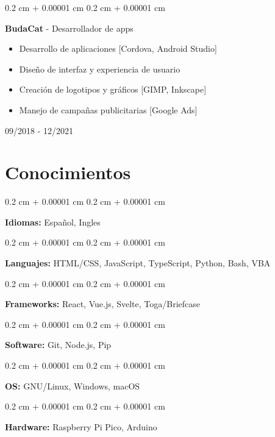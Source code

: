 \documentclass[12pt, letterpaper]{article}
\newenvironment{highlights}{
    \begin{itemize}[
        topsep=0.10 cm,
        parsep=0.10 cm,
        partopsep=0pt,
        itemsep=0pt,
        leftmargin=0.4 cm + 10pt
    ]
}{
    \end{itemize}
} %
\newenvironment{onecolentry}{
    \begin{adjustwidth}{
        0.2 cm + 0.00001 cm
    }{
        0.2 cm + 0.00001 cm
    }
}{
    \end{adjustwidth}
} %
\newenvironment{twocolentry}[2][]{
    \onecolentry
    \def\secondColumn{#2}
    \setcolumnwidth{\fill, 4.5 cm}
    \begin{paracol}{2}
}{
    \switchcolumn \raggedleft \secondColumn
    \end{paracol}
    \endonecolentry
} %
\begin{document}
\vspace{0.3 cm}

\begin{twocolentry}{

        09/2018 - 12/2021
    }
    \textbf{BudaCat} - Desarrollador de apps
    \begin{highlights}
        \item Desarrollo de aplicaciones [Cordova, Android Studio]
        \item Diseño de interfaz y experiencia de usuario
        \item Creación de logotipos y gráficos [GIMP, Inkscape]
        \item Manejo de campañas publicitarias [Google Ads]
    \end{highlights}
\end{twocolentry}

\vspace{0.5 cm}

\section{Conocimientos}

\vspace{0.2 cm}

\begin{onecolentry}
    \textbf{Idiomas:} Español, Ingles
\end{onecolentry}

\vspace{0.2 cm}

\begin{onecolentry}
    \textbf{Languajes:} HTML/CSS, JavaScript, TypeScript, Python, Bash, VBA
\end{onecolentry}

\vspace{0.2 cm}

\begin{onecolentry}
    \textbf{Frameworks:} React, Vue.js, Svelte, Toga/Briefcase
\end{onecolentry}

\vspace{0.2 cm}

\begin{onecolentry}
    \textbf{Software:} Git, Node.js, Pip
\end{onecolentry}

\vspace{0.2 cm}

\begin{onecolentry}
    \textbf{OS:} GNU/Linux, Windows, macOS
\end{onecolentry}

\vspace{0.2 cm}

\begin{onecolentry}
    \textbf{Hardware:} Raspberry Pi Pico, Arduino
\end{onecolentry}
\end{document}
